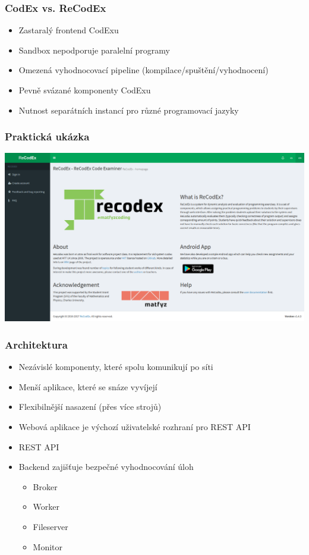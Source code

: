 \documentclass{beamer}
\begin{document}
\begin{frame}
	\frametitle{CodEx vs. ReCodEx}
	\begin{itemize}
		\item Zastaralý frontend CodExu
		\item Sandbox nepodporuje paralelní programy
		\item Omezená vyhodnocovací pipeline (kompilace/spuštění/vyhodnocení)
		\item Pevně svázané komponenty CodExu
		\item Nutnost separátních instancí pro různé programovací jazyky
	\end{itemize}
\end{frame}

\begin{frame}
	\frametitle{Praktická ukázka}
	\begin{center}
		\includegraphics[width=1\textwidth]{images/recodex-screen.png}
	\end{center}
\end{frame}

\begin{frame}
	\frametitle{Architektura}
	\begin{itemize}
		\item Nezávislé komponenty, které spolu komunikují po síti
		\item Menší aplikace, které se snáze vyvíjejí
		\item Flexibilnější nasazení (přes více strojů)
		\item Webová aplikace je výchozí uživatelské rozhraní pro REST API
		\item REST API 
		\item Backend zajišťuje bezpečné vyhodnocování úloh
		\begin{itemize}
			\item Broker
			\item Worker
			\item Fileserver
			\item Monitor
		\end{itemize}
	\end{itemize}
\end{frame}
\end{document}
